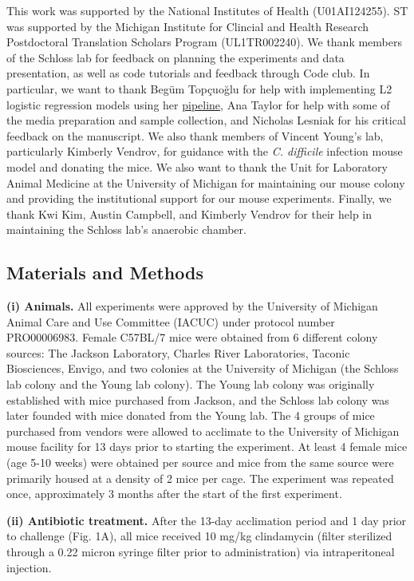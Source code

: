 \documentclass[11pt,]{article}
\begin{document}
This work was supported by the National Institutes of Health
(U01AI124255). ST was supported by the Michigan Institute for Clincial
and Health Research Postdoctoral Translation Scholars Program
(UL1TR002240). We thank members of the Schloss lab for feedback on
planning the experiments and data presentation, as well as code
tutorials and feedback through Code club. In particular, we want to
thank Begüm Topçuoğlu for help with implementing L2 logistic regression
models using her
\href{https://github.com/SchlossLab/ML_pipeline_microbiome}{pipeline},
Ana Taylor for help with some of the media preparation and sample
collection, and Nicholas Lesniak for his critical feedback on the
manuscript. We also thank members of Vincent Young's lab, particularly
Kimberly Vendrov, for guidance with the \emph{C. difficile} infection
mouse model and donating the mice. We also want to thank the Unit for
Laboratory Animal Medicine at the University of Michigan for maintaining
our mouse colony and providing the institutional support for our mouse
experiments. Finally, we thank Kwi Kim, Austin Campbell, and Kimberly
Vendrov for their help in maintaining the Schloss lab's anaerobic
chamber.

\newpage

\subsection{Materials and Methods}\label{materials-and-methods}

\textbf{(i) Animals.} All experiments were approved by the University of
Michigan Animal Care and Use Committee (IACUC) under protocol number
PRO00006983. Female C57BL/7 mice were obtained from 6 different colony
sources: The Jackson Laboratory, Charles River Laboratories, Taconic
Biosciences, Envigo, and two colonies at the University of Michigan (the
Schloss lab colony and the Young lab colony). The Young lab colony was
originally established with mice purchased from Jackson, and the Schloss
lab colony was later founded with mice donated from the Young lab. The 4
groups of mice purchased from vendors were allowed to acclimate to the
University of Michigan mouse facility for 13 days prior to starting the
experiment. At least 4 female mice (age 5-10 weeks) were obtained per
source and mice from the same source were primarily housed at a density
of 2 mice per cage. The experiment was repeated once, approximately 3
months after the start of the first experiment.

\textbf{(ii) Antibiotic treatment.} After the 13-day acclimation period
and 1 day prior to challenge (Fig. 1A), all mice received 10 mg/kg
clindamycin (filter sterilized through a 0.22 micron syringe filter
prior to administration) via intraperitoneal injection.
\end{document}
